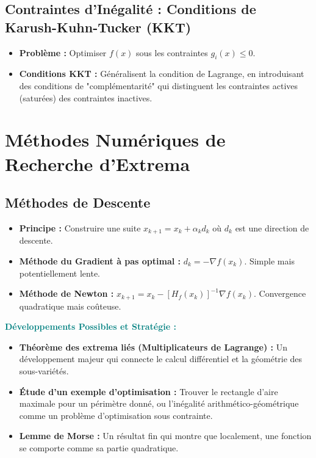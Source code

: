 \documentclass[12pt, a4paper, parskip=full]{report}
\theoremstyle{agregstyle}
\newenvironment{developpements}
  {\par\medskip\noindent\begin{oframed}\noindent\textbf{\textcolor{teal}{Développements Possibles et Stratégie :}}}
  {\end{oframed}\par\medskip}
\begin{document}
\subsection{Contraintes d'Inégalité : Conditions de Karush-Kuhn-Tucker (KKT)}
\begin{itemize}
    \item \textbf{Problème :} Optimiser $f(x)$ sous les contraintes $g_i(x) \le 0$.
    \item \textbf{Conditions KKT :} Généralisent la condition de Lagrange, en introduisant des conditions de "complémentarité" qui distinguent les contraintes actives (saturées) des contraintes inactives.
\end{itemize}

\section{Méthodes Numériques de Recherche d'Extrema}
\subsection{Méthodes de Descente}
\begin{itemize}
    \item \textbf{Principe :} Construire une suite $x_{k+1} = x_k + \alpha_k d_k$ où $d_k$ est une direction de descente.
    \item \textbf{Méthode du Gradient à pas optimal :} $d_k = -\nabla f(x_k)$. Simple mais potentiellement lente.
    \item \textbf{Méthode de Newton :} $x_{k+1} = x_k - [H_f(x_k)]^{-1} \nabla f(x_k)$. Convergence quadratique mais coûteuse.
\end{itemize}

\begin{developpements}
    \begin{itemize}
        \item \textbf{Théorème des extrema liés (Multiplicateurs de Lagrange) :} Un développement majeur qui connecte le calcul différentiel et la géométrie des sous-variétés.
        \item \textbf{Étude d'un exemple d'optimisation :} Trouver le rectangle d'aire maximale pour un périmètre donné, ou l'inégalité arithmético-géométrique comme un problème d'optimisation sous contrainte.
        \item \textbf{Lemme de Morse :} Un résultat fin qui montre que localement, une fonction se comporte comme sa partie quadratique.
    \end{itemize}
\end{developpements}
\end{document}
